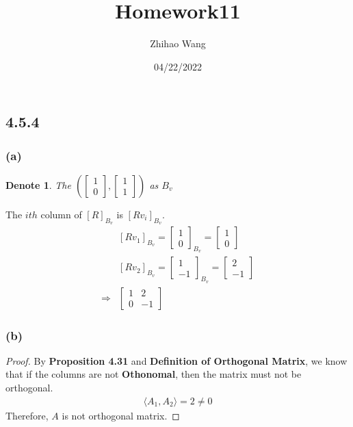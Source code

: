 \documentclass{article}
\title{Homework11}
\author{Zhihao Wang}
\date{04/22/2022}
\newtheorem*{denote}{Denote}
\newtheorem*{proof}{Proof}
\begin{document}
\maketitle 

\subsection*{4.5.4}
\subsubsection*{(a)}
\begin{denote}
    The $ \left(\begin{bmatrix}
        1 \\ 0
    \end{bmatrix}, \begin{bmatrix}
        1 \\ 1
    \end{bmatrix} \right) $ as $B_v$
\end{denote}
The $ith$ column of $[R]_{B_v}$ is $[Rv_i]_{B_v}$.
\begin{equation*}
    \begin{split}
        &[Rv_1]_{B_v} = \begin{bmatrix}
            1 \\ 0
        \end{bmatrix}_{B_v} = \begin{bmatrix}
            1 \\ 0
        \end{bmatrix} \\
        &[Rv_2]_{B_v} = \begin{bmatrix}
            1 \\ -1
        \end{bmatrix}_{B_v} = \begin{bmatrix}
            2 \\ -1
        \end{bmatrix} \\
        \Rightarrow & \begin{bmatrix}
            1 & 2 \\ 0 & -1
        \end{bmatrix}
    \end{split} 
\end{equation*}

\subsubsection*{(b)}
\begin{proof}
    By \textbf{Proposition 4.31} and \textbf{Definition of Orthogonal Matrix}, we know that if the columns are not \textbf{Othonomal}, then the matrix must
    not be orthogonal.
    \begin{equation*}
        \begin{split}
            \langle A_1, A_2 \rangle = 2 \neq 0
        \end{split}
    \end{equation*}
    Therefore, $A$ is not orthogonal matrix.
\end{proof}
\end{document}
